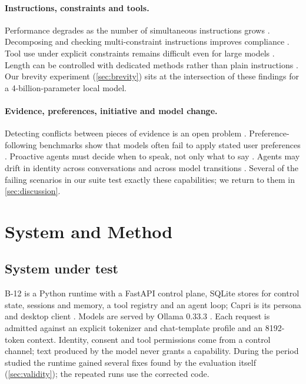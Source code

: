 \documentclass[11pt,a4paper]{article}
\begin{document}
\paragraph{Instructions, constraints and tools.} Performance degrades as the number of simultaneous instructions grows \cite{multiply}. Decomposing and checking multi-constraint instructions improves compliance \cite{decrim}. Tool use under explicit constraints remains difficult even for large models \cite{cctu}. Length can be controlled with dedicated methods rather than plain instructions \cite{ruler}. Our brevity experiment (\cref{sec:brevity}) sits at the intersection of these findings for a 4-billion-parameter local model.

\paragraph{Evidence, preferences, initiative and model change.} Detecting conflicts between pieces of evidence is an open problem \cite{econ,conflictweb}. Preference-following benchmarks show that models often fail to apply stated user preferences \cite{prefeval,botherme,benchpres}. Proactive agents must decide when to speak, not only what to say \cite{proactive,chimein}. Agents may drift in identity across conversations and across model transitions \cite{drift,transition}. Several of the failing scenarios in our suite test exactly these capabilities; we return to them in \cref{sec:discussion}.

\section{System and Method}\label{sec:method}
\subsection{System under test}
B-12 is a Python runtime with a FastAPI control plane, SQLite stores for control state, sessions and memory, a tool registry and an agent loop; Capri is its persona and desktop client \cite{capriprev}. Models are served by Ollama 0.33.3 \cite{ollama}. Each request is admitted against an explicit tokenizer and chat-template profile and an 8192-token context. Identity, consent and tool permissions come from a control channel; text produced by the model never grants a capability. During the period studied the runtime gained several fixes found by the evaluation itself (\cref{sec:validity}); the repeated runs use the corrected code.
\end{document}
